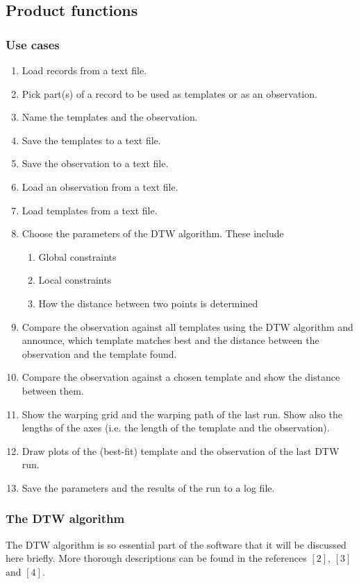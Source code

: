 \documentclass[a4paper,11pt]{article}
\begin{document}
\subsection{Product functions}

\subsubsection{Use cases}
\begin{enumerate}
\item Load records from a text file.
\item Pick part(s) of a record to be used as templates or as an observation.
\item Name the templates and the observation.
\item Save the templates to a text file.
\item Save the observation to a text file.
\item Load an observation from a text file.
\item Load templates from a text file.
\item Choose the parameters of the DTW algorithm. These include
\begin{enumerate}
\item Global constraints
\item Local constraints
\item How the distance between two points is determined
\end{enumerate}
\item Compare the observation against all templates using the DTW algorithm and announce, which template matches best
and the distance between the observation and the template found.
\item Compare the observation against a chosen template and show the distance between them.
\item Show the warping grid and the warping path of the last run. Show also the lengths of the axes (i.e. the length
of the template and the observation).
\item Draw plots of the (best-fit) template and the observation of the last DTW run.
\item Save the parameters and the results of the run to a log file.
\end{enumerate}

\subsubsection{The DTW algorithm}
\label{sec:dtw}
The DTW algorithm is so essential part of the software that it will be discussed here briefly. More thorough descriptions
can be found in the references $[2]$, $[3]$ and $[4]$.
\end{document}
